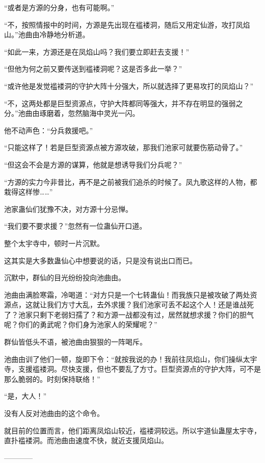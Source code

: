 \begin{this_body}
“或者是方源的分身，也有可能啊。”

“不，按照情报中的时间，方源是先出现在褴褛洞，随后又用定仙游，攻打凤焰山。”池曲由冷静地分析道。

“如此一来，方源还是在凤焰山吗？我们要立即赶去支援！”

“但他为何之前又要传送到褴褛洞呢？这是否多此一举？”

“或许他是发觉褴褛洞的守护大阵十分强大，所以就选择了更易攻打的凤焰山？”

“不，这两处都是巨型资源点，守护大阵都同等强大，并不存在明显的强弱之分。”池曲由琢磨着，忽然脑海中灵光一闪。

他不动声色：“分兵救援吧。”

“只能这样了！若是巨型资源点被方源攻破，那我们池家可就要伤筋动骨了。”

“但这会不会是方源的谋算，他就是想诱导我们分兵呢？”

“方源的实力今非昔比，再不是之前被我们追杀的时候了。凤九歌这样的人物，都栽得这样惨……”

池家蛊仙们犹豫不决，对方源十分忌惮。

“我们要不要求援？”忽然有一位蛊仙开口道。

整个太宇寺中，顿时一片沉默。

这其实是大多数蛊仙心中想要说的话，只是没有说出口而已。

沉默中，群仙的目光纷纷投向池曲由。

池曲由满脸寒霜，冷喝道：“对方只是一个七转蛊仙！而我族只是被攻破了两处资源点，这就让我们方寸大乱，去外求援？我们池家可丢不起这个人！还是谁战死了？池家只剩下老弱妇孺了？和方源一战都没有过，居然就想求援？你们的胆气呢？你们的勇武呢？你们身为池家人的荣耀呢？”

群仙皆低头不语，被池曲由狠狠的一阵喝斥。

池曲由训了他们一顿，旋即下令：“就按我说的办！我前往凤焰山，你们操纵太宇寺，支援褴褛洞。尽快支援，但也不要乱了方寸。巨型资源点的守护大阵，可不是那么脆弱的。时刻保持联络！”

“是，大人！”

没有人反对池曲由的这个命令。

就目前的位置而言，他们距离凤焰山较近，褴褛洞较远。所以宇道仙蛊屋太宇寺，直扑褴褛洞。而池曲由速度不快，就近支援凤焰山。

------------

\end{this_body}

